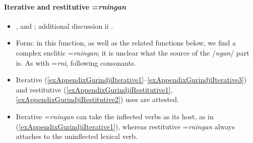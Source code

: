 \paragraph{Iterative and restitutive =\textit{rningan}}
\label{appendixGurindjiIterative}
\begin{itemize}
	\item \textcite{McConvell1983}, \textcite[597–598]{MeakinsMcConvell2021} and \textcite[s.v. \textit{rningan}]{MeakinsEtAl2013}; additional discussion ii \textcite{SchultzeBerndt2002}.
	\item Form: in this function, as well as the related functions below, we find a complex enclitic \mbox{=\textit{rningan}}; it is unclear what the source of the /\textit{ngan}/ part is. As with \mbox{=\textit{rni}}, following consonants.
	\item Iterative (\ref{exAppendixGurindjiIterative1}–\ref{exAppendixGurindjiIterative3}) and restitutive  (\ref{exAppendixGurindjiRestitutive1}, \ref{exAppendixGurindjiRestitutive2}) uses are attested. 
	\item Iterative \mbox{=\textit{rningan}} can take the inflected verbs as its host, as in (\ref{exAppendixGurindjiIterative1}), whereas restitutive \mbox{=\textit{rningan}} always attaches to the uninflected lexical verb.
\end{itemize}

